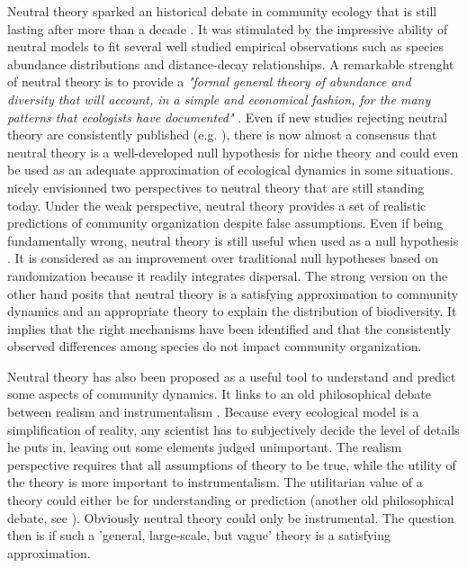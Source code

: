 \documentclass[12pt]{article}
\begin{document}
Neutral theory sparked an historical debate in community ecology that is still
lasting after more than a decade \parencite{Chave2004, Etiennee2011,
Rosindell2012,Clark2012}. It was stimulated by the impressive ability of neutral
models to fit several well studied empirical observations such as species
abundance distributions and distance-decay relationships. A remarkable strenght
of neutral theory is to provide a \emph{"formal general theory of abundance
and diversity that will account, in a simple and economical fashion, for the
many patterns that ecologists have documented"} \parencite{Bell2001}. Even if
new studies rejecting neutral theory are consistently published (e.g.
\textcite{Ricklefs2012}), there is now almost a consensus that neutral theory is
a well-developed null hypothesis for niche theory and could even be used as an
adequate approximation of ecological dynamics in some situations.
\textcite{Bell2001} nicely envisionned two perspectives to neutral theory that
are still standing today. Under the weak perspective, neutral theory provides a
set of realistic predictions of community organization despite false
assumptions. Even if being fundamentally wrong, neutral theory is still useful
when used as a null hypothesis \parencite{Gotelli2006}. It is considered as an
improvement over traditional null hypotheses based on randomization
\parencite{Gotelli2000} because it readily integrates dispersal. The strong
version on the other hand posits that neutral theory is a satisfying
approximation to community dynamics and an appropriate theory to explain the
distribution of biodiversity. It implies that the right mechanisms have been
identified and that the consistently observed differences among species do not
impact community organization. 

Neutral theory has also been proposed as a useful tool to understand and predict
some aspects of community dynamics. It links to an old philosophical debate
between realism and instrumentalism \parencite{Wennekes2011}. Because every
ecological model is a simplification of reality, any scientist has to
subjectively decide the level of details he puts in, leaving out some elements
judged unimportant. The realism perspective requires that all assumptions of
theory to be true, while the utility of the theory is more important to
instrumentalism. The utilitarian value of a theory could either be for
understanding or prediction (another old philosophical debate, see
\textcite{Schmueli2010}). Obviously neutral theory could only be instrumental.
The question then is if such a 'general, large-scale, but vague' theory
\parencite{Wennekes2011} is a satisfying approximation. 
\end{document}

